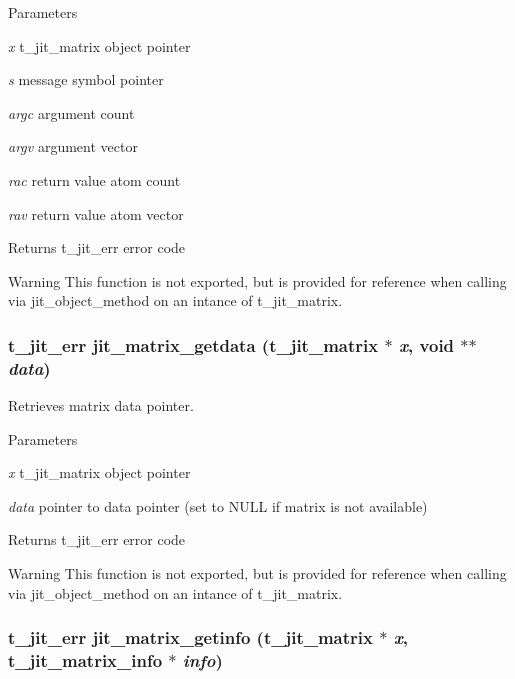 \begin{DoxyParams}{Parameters}
\item[{\em x}]t\_\-jit\_\-matrix object pointer \item[{\em s}]message symbol pointer \item[{\em argc}]argument count \item[{\em argv}]argument vector \item[{\em rac}]return value atom count \item[{\em rav}]return value atom vector\end{DoxyParams}
\begin{DoxyReturn}{Returns}
t\_\-jit\_\-err error code
\end{DoxyReturn}
\begin{DoxyWarning}{Warning}
This function is not exported, but is provided for reference when calling via jit\_\-object\_\-method on an intance of t\_\-jit\_\-matrix. 
\end{DoxyWarning}
\hypertarget{group__matrixmod_ga15e9e2b55f6ce23d2c488d8b2bf8b57b}{
\subsubsection[{jit\_\-matrix\_\-getdata}]{\setlength{\rightskip}{0pt plus 5cm}t\_\-jit\_\-err jit\_\-matrix\_\-getdata (t\_\-jit\_\-matrix $\ast$ {\em x}, \/  void $\ast$$\ast$ {\em data})}}
\label{group__matrixmod_ga15e9e2b55f6ce23d2c488d8b2bf8b57b}


Retrieves matrix data pointer. 
\begin{DoxyParams}{Parameters}
\item[{\em x}]t\_\-jit\_\-matrix object pointer \item[{\em data}]pointer to data pointer (set to NULL if matrix is not available)\end{DoxyParams}
\begin{DoxyReturn}{Returns}
t\_\-jit\_\-err error code
\end{DoxyReturn}
\begin{DoxyWarning}{Warning}
This function is not exported, but is provided for reference when calling via jit\_\-object\_\-method on an intance of t\_\-jit\_\-matrix. 
\end{DoxyWarning}
\hypertarget{group__matrixmod_ga52060a5a58fb6503fa66e40336df2d2c}{
\subsubsection[{jit\_\-matrix\_\-getinfo}]{\setlength{\rightskip}{0pt plus 5cm}t\_\-jit\_\-err jit\_\-matrix\_\-getinfo (t\_\-jit\_\-matrix $\ast$ {\em x}, \/  {\bf t\_\-jit\_\-matrix\_\-info} $\ast$ {\em info})}}
\label{group__matrixmod_ga52060a5a58fb6503fa66e40336df2d2c}


